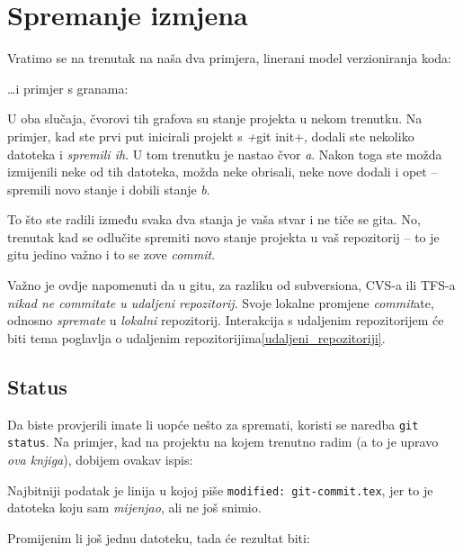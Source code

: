 \chapter*{Spremanje izmjena}

Vratimo se na trenutak na naša dva primjera, linerani model verzioniranja koda:



\dots{}i primjer s granama:



U oba slučaja, čvorovi tih grafova su stanje projekta u nekom trenutku.
Na primjer, kad ste prvi put inicirali projekt s \emph+git init+, dodali ste nekoliko datoteka i \emph{spremili ih}. 
U tom trenutku je nastao čvor \emph a.
Nakon toga ste možda izmijenili neke od tih datoteka, možda neke obrisali, neke nove dodali i opet -- spremili novo stanje i dobili stanje \emph b.

To što ste radili između svaka dva stanja je vaša stvar i ne tiče se gita.
No, trenutak kad se odlučite spremiti novo stanje projekta u vaš repozitorij -- to je gitu jedino važno i to se zove \emph{commit}.

Važno je ovdje napomenuti da u gitu, za razliku od subversiona, CVS-a ili TFS-a \emph{nikad ne commitate u udaljeni repozitorij}. 
Svoje lokalne promjene \emph{commit}ate, odnosno \emph{spremate} u \emph{lokalni} repozitorij.
Interakcija s udaljenim repozitorijem će biti tema poglavlja o udaljenim repozitorijima\ref{udaljeni_repozitoriji}.

\section*{Status}

Da biste provjerili imate li uopće nešto za spremati, koristi se naredba \verb+git status+.
Na primjer, kad na projektu na kojem trenutno radim (a to je upravo \emph{ova knjiga}), dobijem ovakav ispis:



Najbitniji podatak je linija u kojoj piše \verb+modified: git-commit.tex+, jer to je datoteka koju sam \emph{mijenjao}, ali ne još snimio.

Promijenim li još jednu datoteku, tada će rezultat biti:




